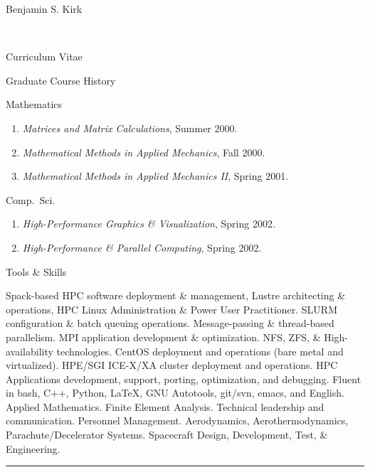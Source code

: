 \documentclass[10pt]{report}
\begin{document}
\begin{cv}{\centerline{\Large Benjamin S. Kirk}\\
    \centerline{\large Curriculum Vitae}}
\begin{cvlist}{Graduate Course History}
      \vspace{.5em}
      \item[Mathematics]

	\begin{enumerate}
  	  \item \emph{Matrices and Matrix Calculations}, Summer 2000.
	  \item \emph{Mathematical Methods in Applied Mechanics}, Fall 2000.
	  \item \emph{Mathematical Methods in Applied Mechanics II}, Spring 2001.
	\end{enumerate}

      \vspace{.5em}
      \item[Comp.\ Sci.]

	\begin{enumerate}
	  \item \emph{High-Performance Graphics \& Visualization}, Spring 2002.
	  \item \emph{High-Performance \& Parallel Computing}, Spring 2002.
	\end{enumerate}
  \end{cvlist}

  \begin{cvlist}{Tools \& Skills}
    \item[]
    Spack-based HPC software deployment \& management, Lustre architecting \& operations, HPC Linux Administration \& Power User Practitioner. SLURM configuration \& batch queuing operations. Message-passing \& thread-based parallelism. MPI application development \& optimization. NFS, ZFS, \& High-availability technologies. CentOS deployment and operations (bare metal and virtualized). HPE/SGI ICE-X/XA cluster deployment and operations. HPC Applications development, support, porting, optimization, and debugging. Fluent in bash, C++, Python, \LaTeX{}, GNU Autotools, git/svn, emacs, and English. Applied Mathematics. Finite Element Analysis. Technical leadership and communication. Personnel Management. Aerodynamics, Aerothermodynamics, Parachute/Decelerator Systems. Spacecraft Design, Development, Test, \& Engineering.
  \end{cvlist}



{\hfill \hrule\hfill\vspace{.1mm} \\}
\end{cv}
\end{document}
